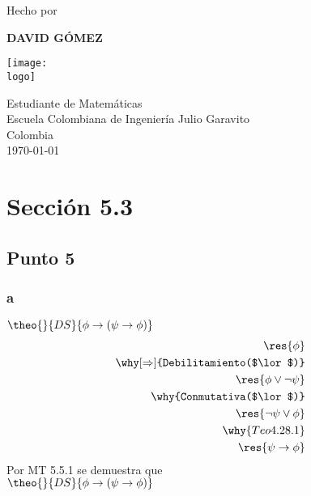 \documentclass{article}
\newcommand{\logo}{C:/Users/usuario/Documents/U/logo-eci.jpg}
\newcommand{\titlename}{Tarea 10}
\renewcommand{\author}{David Gómez}
\begin{document}
\begin{titlepage}
    \begin{center}
        \vspace*{1cm}
 
        \textbf{\fontsize{45}{\baselineskip}\selectfont{\titlename}}

        \vspace{4cm}

        {\Large Hecho por}

        \vspace{1cm}

        {\textbf{\LARGE\MakeUppercase{\author}}}

        \vspace{2cm}

        \texttt{[image: \\logo]}

        \vspace{2cm}

        {\Large Estudiante de Matemáticas\\[5pt]

        Escuela Colombiana de Ingeniería Julio Garavito\\[5pt]

        Colombia\\[5pt]

        \today}
             
    \end{center}
\end{titlepage}

\tableofcontents
\clearpage

\section{Sección 5.3}

\subsection{Punto 5}
\subsubsection{a}
\begin{logicenv}{$\theo{}{DS}{\phi \to (\psi \to \phi)}$}
    \begin{align*}
            \res{\phi}\\
        \why[\Rightarrow]{Debilitamiento($\lor$)}\\
            \res{\phi \lor \neg \psi}\\
        \why{Conmutativa($\lor$)}\\
            \res{\neg \psi \lor \phi}\\
        \why{Teo 4.28.1}\\
            \res{\psi \to \phi}
    \end{align*}
    Por MT 5.5.1 se demuestra que\\
    $\theo{}{DS}{\phi \to (\psi \to \phi)}$
\end{logicenv}
\end{document}
